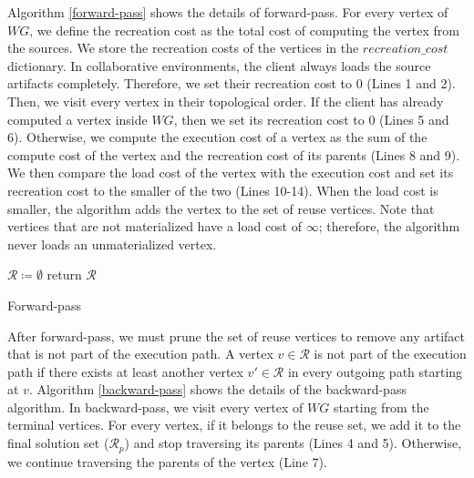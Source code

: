 Algorithm \ref{forward-pass} shows the details of forward-pass.
For every vertex of $WG$, we define the recreation cost as the total cost of computing the vertex from the sources.
We store the recreation costs of the vertices in the $recreation\_cost$ dictionary.
In collaborative environments, the client always loads the source artifacts completely.
Therefore, we set their recreation cost to 0 (Lines 1 and 2).
Then, we visit every vertex in their topological order.
If the client has already computed a vertex inside $WG$, then we set its recreation cost to 0 (Lines 5 and 6).
Otherwise, we compute the execution cost of a vertex as the sum of the compute cost of the vertex and the recreation cost of its parents (Lines 8 and 9).
We then compare the load cost of the vertex with the execution cost and set its recreation cost to the smaller of the two (Lines 10-14).
When the load cost is smaller, the algorithm adds the vertex to the set of reuse vertices.
Note that vertices that are not materialized have a load cost of $\infty$; therefore, the algorithm never loads an unmaterialized vertex.

\begin{algorithm}[h]
$\mathcal{R} \coloneqq \emptyset$\;
return $\mathcal{R}$\;
\caption{Forward-pass}\label{forward-pass}
\end{algorithm}
After forward-pass, we must prune the set of reuse vertices to remove any artifact that is not part of the execution path.
A vertex $v \in \mathcal{R}$ is not part of the execution path if there exists at least another vertex $v' \in \mathcal{R}$ in every outgoing path starting at $v$.
Algorithm \ref{backward-pass} shows the details of the backward-pass algorithm.
In backward-pass, we visit every vertex of $WG$ starting from the terminal vertices.
For every vertex, if it belongs to the reuse set, we add it to the final solution set ($\mathcal{R}_p$) and stop traversing its parents (Lines 4 and 5).
Otherwise, we continue traversing the parents of the vertex (Line 7).

